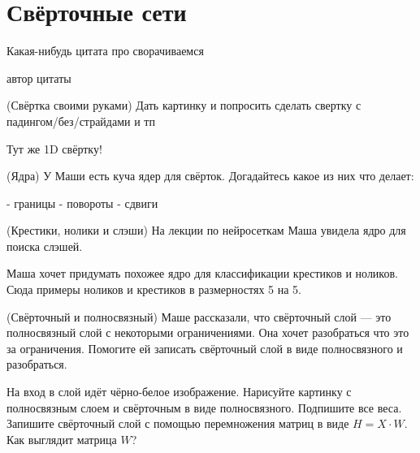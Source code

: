 
\section{Свёрточные сети}

\epigraph{Какая-нибудь цитата про сворачиваемся}{автор цитаты}


\begin{problem}{(Свёртка своими руками)}
Дать картинку и попросить сделать свертку с падингом/без/страйдами и тп

Тут же 1D свёртку! 
\end{problem}


\begin{problem}{(Ядра)}
У Маши есть куча ядер для свёрток. Догадайтесь какое из них что делает: 

- границы
- повороты
- сдвиги 
\end{problem}


\begin{problem}{(Крестики, нолики и слэши)}
На лекции по нейросеткам Маша увидела ядро для поиска слэшей. 


Маша хочет придумать похожее ядро для классификации крестиков и ноликов. Сюда примеры ноликов и крестиков в размерностях 5 на 5.
\end{problem}



\begin{problem}{(Свёрточный и полносвязный)}
Маше рассказали, что свёрточный слой --- это полносвязный слой с некоторыми ограничениями. Она хочет разобраться что это за ограничения. Помогите ей записать свёрточный слой в виде полносвязного и разобраться. 

На вход в слой идёт чёрно-белое изображение. Нарисуйте картинку с полносвязным слоем и свёрточным в виде полносвязного. Подпишите все веса. Запишите свёрточный слой с помощью перемножения матриц в виде $H = X \cdot W.$ Как выглядит матрица $W$? 
\end{problem}


